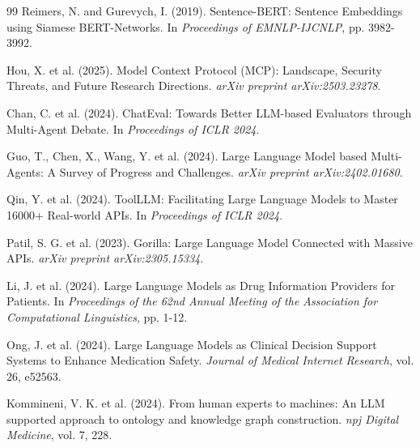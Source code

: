 \documentclass[12pt]{article}
\begin{document}
\begin{thebibliography}{99}
Reimers, N. and Gurevych, I. (2019). Sentence-BERT: Sentence Embeddings using Siamese BERT-Networks. In \textit{Proceedings of EMNLP-IJCNLP}, pp. 3982-3992.

Hou, X. et al. (2025). Model Context Protocol (MCP): Landscape, Security Threats, and Future Research Directions. \textit{arXiv preprint arXiv:2503.23278}.

Chan, C. et al. (2024). ChatEval: Towards Better LLM-based Evaluators through Multi-Agent Debate. In \textit{Proceedings of ICLR 2024}.

Guo, T., Chen, X., Wang, Y. et al. (2024). Large Language Model based Multi-Agents: A Survey of Progress and Challenges. \textit{arXiv preprint arXiv:2402.01680}.

Qin, Y. et al. (2024). ToolLLM: Facilitating Large Language Models to Master 16000+ Real-world APIs. In \textit{Proceedings of ICLR 2024}.

Patil, S. G. et al. (2023). Gorilla: Large Language Model Connected with Massive APIs. \textit{arXiv preprint arXiv:2305.15334}.

Li, J. et al. (2024). Large Language Models as Drug Information Providers for Patients. In \textit{Proceedings of the 62nd Annual Meeting of the Association for Computational Linguistics}, pp. 1-12.

Ong, J. et al. (2024). Large Language Models as Clinical Decision Support Systems to Enhance Medication Safety. \textit{Journal of Medical Internet Research}, vol. 26, e52563.

Kommineni, V. K. et al. (2024). From human experts to machines: An LLM supported approach to ontology and knowledge graph construction. \textit{npj Digital Medicine}, vol. 7, 228.

\end{thebibliography}
\end{document}
